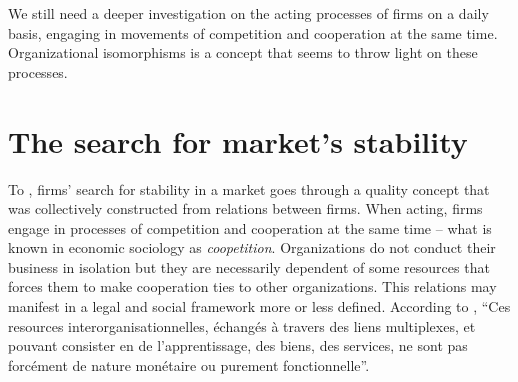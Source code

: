 \documentclass[a4paper, 12pt, openright, oneside, german, french, brazil, english]{abntex2}
\begin{document}

	We still need a deeper investigation on the acting processes of firms on a daily basis, engaging in movements of competition and cooperation at the same time. Organizational isomorphisms is a concept that seems to throw light on these processes.

        
	\section{The search for market's stability}
	
	To , firms' search for stability in a market goes through a quality concept that was collectively constructed from relations between firms. When acting, firms engage in processes of competition and cooperation at the same time -- what is known in economic sociology as \textit{coopetition}. Organizations do not conduct their business in isolation but they are necessarily dependent of some resources that forces them to make cooperation ties to other organizations. This relations may manifest in a legal and social framework more or less defined. According to , ``Ces resources interorganisationnelles, échangés à travers des liens multiplexes, et pouvant consister en de l'apprentissage, des biens, des services, ne sont pas forcément de nature monétaire ou purement fonctionnelle''.
	
\end{document}
